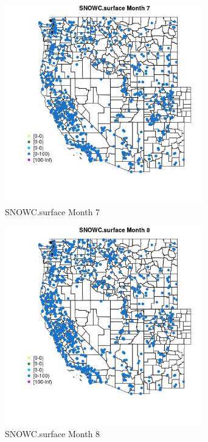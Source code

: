 \begin{figure} 
\centering  
\includegraphics[width=0.77\textwidth]{Code_Outputs/Report_ML_input_PM25_Step4_part_f_de_duplicated_aveswNAs_MapObsMo7SNOWCsurface.jpg} 
\caption{\label{fig:Report_ML_input_PM25_Step4_part_f_de_duplicated_aveswNAsMapObsMo7SNOWCsurface}SNOWC.surface Month 7} 
\end{figure} 
 

\clearpage 

\begin{figure} 
\centering  
\includegraphics[width=0.77\textwidth]{Code_Outputs/Report_ML_input_PM25_Step4_part_f_de_duplicated_aveswNAs_MapObsMo8SNOWCsurface.jpg} 
\caption{\label{fig:Report_ML_input_PM25_Step4_part_f_de_duplicated_aveswNAsMapObsMo8SNOWCsurface}SNOWC.surface Month 8} 
\end{figure} 
 

